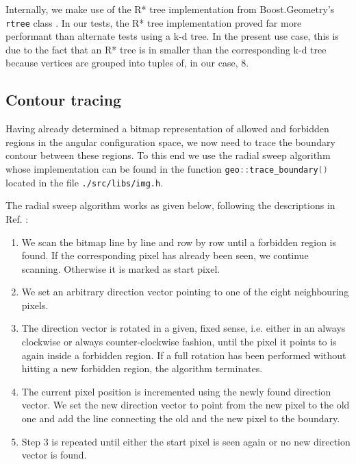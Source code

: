 Internally, we make use of the R* tree implementation from Boost.Geometry's \cite{web_boost_geometry}
\lstinline[language=C++]|rtree| class \cite{web_boost_geometry_rtree}.
In our tests, the R* tree implementation proved far more performant than alternate tests using a k-d tree.
In the present use case, this is due to the fact that an R* tree is in smaller than the corresponding k-d tree
because vertices are grouped into tuples of, in our case, 8.



\subsection{Contour tracing}
\label{sec:contourtracing}
Having already determined a bitmap representation of allowed and forbidden regions in the angular configuration space,
we now need to trace the boundary contour between these regions.
To this end we use the radial sweep algorithm \cite{web_radial_sweep} whose implementation can be found
in the function \lstinline[language=C++]|geo::trace_boundary()| located in the file \lstinline|./src/libs/img.h|.

The radial sweep algorithm works as given below, following the descriptions in Ref. \cite{web_radial_sweep}:
\begin{enumerate}
	\item We scan the bitmap line by line and row by row until a forbidden region is found. 
		If the corresponding pixel has already been seen, we continue scanning. Otherwise it is marked as start pixel.
	\item We set an arbitrary direction vector pointing to one of the eight neighbouring pixels.
	\item The direction vector is rotated in a given, fixed sense, i.e. either in an always clockwise or 
		always counter-clockwise fashion, until the pixel it points to is again inside a forbidden region.
		If a full rotation has been performed without hitting a new forbidden region, the algorithm terminates.
	\item The current pixel position is incremented using the newly found direction vector. 
		We set the new direction vector to point from the new pixel to the old one and
		add the line connecting the old and the new pixel to the boundary.
	\item Step 3 is repeated until either the start pixel is seen again or no new direction vector is found.
\end{enumerate}



